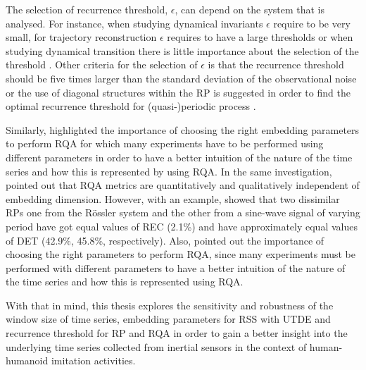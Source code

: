 The selection of recurrence threshold, $\epsilon$, 
can depend on the system that is analysed.
For instance, when studying dynamical invariants $\epsilon$ 
require to be very small, for trajectory reconstruction 
$\epsilon$ requires to have a large thresholds or 
when studying dynamical transition 
there is little importance about the selection of the threshold \cite{marwan2011}.
Other criteria for the selection of $\epsilon$ is that 
the recurrence threshold  should be five times larger 
than the standard deviation of the observational noise
or the use of diagonal structures within the RP is suggested in order
to find the optimal recurrence threshold for (quasi-)periodic process \cite{marwan2011}.

Similarly, \cite{iwanski1998} highlighted the importance 
of choosing the right embedding parameters 
to perform RQA for which many experiments have to be performed 
using different parameters in order to have a better intuition 
of the nature of the time series and how this is represented by using RQA.
In the same investigation, \cite{iwanski1998} pointed out that RQA metrics
are quantitatively and qualitatively independent of embedding 
dimension. However, with an example, \cite{iwanski1998} showed that 
two dissimilar RPs one from the R\"{o}ssler system and 
the other from a sine-wave signal of varying period have got equal 
values of REC (2.1\%) and have approximately equal values of DET (42.9\%, 45.8\%, respectively).
Also, \cite{iwanski1998} pointed out the importance of choosing the 
right parameters to perform RQA, since many experiments must be performed 
with different parameters to have a better intuition of the nature 
of the time series and how this is represented using RQA.

With that in mind, this thesis explores the sensitivity and robustness 
of the window size of time series, embedding parameters for RSS with UTDE 
and recurrence threshold for RP and RQA 
in order to gain a better insight into the underlying time series 
collected from inertial sensors in the context of human-humanoid imitation activities.







